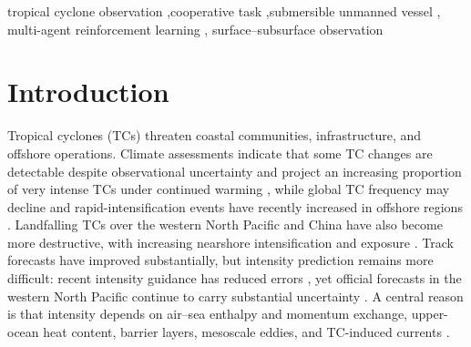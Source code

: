 \documentclass[a4paper,fleqn]{cas-dc}
\begin{document}
\begin{keywords}
tropical cyclone observation \sep cooperative task \sep submersible unmanned vessel \sep
multi-agent reinforcement learning \sep
surface--subsurface observation
\end{keywords}

\maketitle

\section{Introduction}
Tropical cyclones (TCs) threaten coastal communities, infrastructure, and
offshore operations. Climate assessments indicate that some TC changes are
detectable despite observational uncertainty \citep{r1} and project an
increasing proportion of very intense TCs under continued warming \citep{r2},
while global TC frequency may decline \citep{r3} and rapid-intensification
events have recently increased in offshore regions \citep{r4}. Landfalling TCs
over the western North Pacific and China have also become more destructive,
with increasing nearshore intensification and exposure \citep{r5,r6,r7,r8}.
Track forecasts have improved substantially, but intensity prediction remains
more difficult: recent intensity guidance has reduced errors \citep{r9}, yet
official forecasts in the western North Pacific continue to carry substantial
uncertainty \citep{r10}. A central reason is that intensity depends on air--sea
enthalpy and momentum exchange, upper-ocean heat content, barrier layers,
mesoscale eddies, and TC-induced currents \citep{r11,r12}.
\end{document}
